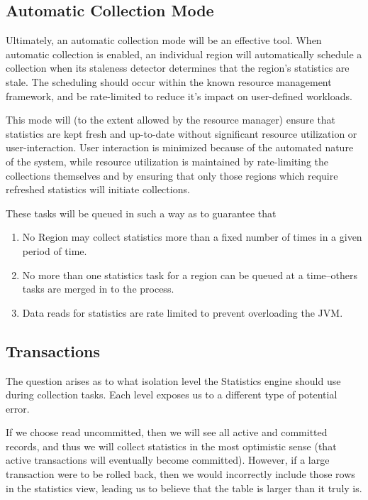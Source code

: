\subsection{Automatic Collection Mode}
Ultimately, an automatic collection mode will be an effective tool. When automatic collection is enabled, an individual region will automatically schedule a collection when its staleness detector determines that the region's statistics are stale. The scheduling should occur within the known resource management framework, and be rate-limited to reduce it's impact on user-defined workloads.

This mode will (to the extent allowed by the resource manager) ensure that statistics are kept fresh and up-to-date without significant resource utilization or user-interaction. User interaction is minimized because of the automated nature of the system, while resource utilization is maintained by rate-limiting the collections themselves and by ensuring that only those regions which require refreshed statistics will initiate collections.

These tasks will be queued in such a way as to guarantee that

\begin{enumerate}
				\item No Region may collect statistics more than a fixed number of times in a given period of time.
				\item No more than one statistics task for a region can be queued at a time--others tasks are merged in to the process.
				\item Data reads for statistics are rate limited to prevent overloading the JVM.
\end{enumerate}

\subsection{Transactions}
The question arises as to what isolation level the Statistics engine should use during collection tasks. Each level exposes us to a different type of potential error. 

If we choose read uncommitted, then we will see all active and committed records, and thus we will collect statistics in the most optimistic sense (that active transactions will eventually become committed). However, if a large transaction were to be rolled back, then we would incorrectly include those rows in the statistics view, leading us to believe that the table is larger than it truly is.

